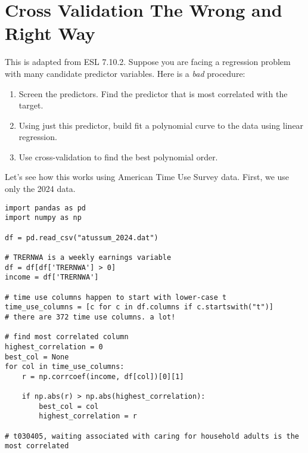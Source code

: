 
\section{Cross Validation The Wrong and Right Way}

This is adapted from ESL 7.10.2. Suppose you are facing a regression problem with many candidate predictor variables. Here is a \emph{bad} procedure:

\begin{enumerate}
   \item Screen the predictors. Find the predictor that is most correlated with the target. 
   \item Using just this predictor, build fit a polynomial curve to the data using linear regression. 
   \item Use cross-validation to find the best polynomial order. 
\end{enumerate}

Let's see how this works using American Time Use Survey data. First, we use only the 2024 data. 

\begin{lstlisting}
import pandas as pd
import numpy as np

df = pd.read_csv("atussum_2024.dat")

# TRERNWA is a weekly earnings variable
df = df[df['TRERNWA'] > 0]
income = df['TRERNWA']

# time use columns happen to start with lower-case t
time_use_columns = [c for c in df.columns if c.startswith("t")]
# there are 372 time use columns. a lot!

# find most correlated column
highest_correlation = 0
best_col = None
for col in time_use_columns:
    r = np.corrcoef(income, df[col])[0][1]
    
    if np.abs(r) > np.abs(highest_correlation):
        best_col = col
        highest_correlation = r

# t030405, waiting associated with caring for household adults is the most correlated    
\end{lstlisting}


